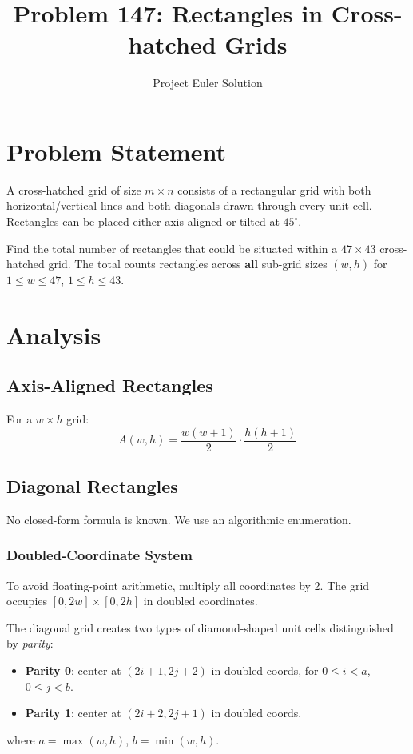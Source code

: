 \documentclass[12pt]{article}
\title{Problem 147: Rectangles in Cross-hatched Grids}
\author{Project Euler Solution}
\date{}
\begin{document}
\maketitle

\section{Problem Statement}
A cross-hatched grid of size $m \times n$ consists of a rectangular grid with both horizontal/vertical lines and both diagonals drawn through every unit cell. Rectangles can be placed either axis-aligned or tilted at $45^\circ$.

Find the total number of rectangles that could be situated within a $47 \times 43$ cross-hatched grid. The total counts rectangles across \textbf{all} sub-grid sizes $(w,h)$ for $1 \le w \le 47$, $1 \le h \le 43$.

\section{Analysis}

\subsection{Axis-Aligned Rectangles}
For a $w \times h$ grid:
\[
A(w,h) = \frac{w(w+1)}{2} \cdot \frac{h(h+1)}{2}
\]

\subsection{Diagonal Rectangles}
No closed-form formula is known. We use an algorithmic enumeration.

\subsubsection{Doubled-Coordinate System}
To avoid floating-point arithmetic, multiply all coordinates by 2. The grid occupies $[0, 2w] \times [0, 2h]$ in doubled coordinates.

The diagonal grid creates two types of diamond-shaped unit cells distinguished by \emph{parity}:
\begin{itemize}
    \item \textbf{Parity 0}: center at $(2i+1, 2j+2)$ in doubled coords, for $0 \le i < a$, $0 \le j < b$.
    \item \textbf{Parity 1}: center at $(2i+2, 2j+1)$ in doubled coords.
\end{itemize}
where $a = \max(w,h)$, $b = \min(w,h)$.
\end{document}
